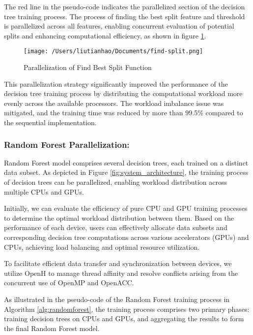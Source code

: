 \documentclass[13pt]{article}
\begin{document}
The red line in the pseudo-code indicates the parallelized section of the decision tree training process.
The process of finding the best split feature and threshold is parallelized across all features, enabling concurrent evaluation of potential splits and enhancing computational efficiency, as shown in figure \ref{fig:parallelization}.

\begin{figure}[h!]
    \centering
    \texttt{[image: /Users/liutianhao/Documents/find-split.png]}
    \caption{Parallelization of Find Best Split Function}
    \label{fig:parallelization}
\end{figure}

This parallelization strategy significantly improved the performance of the decision tree training process by distributing the computational workload more evenly across the available processors.
The workload imbalance issue was mitigated, and the training time was reduced by more than 99.5\% compared to the sequential implementation.

\subsubsection{Random Forest Parallelization:} 
    
Random Forest model comprises several decision trees, each trained on a distinct data subset. As depicted in Figure \ref{fig:system_architecture}, the training process of decision trees can be parallelized, enabling workload distribution across multiple CPUs and GPUs.

Initially, we can evaluate the efficiency of pure CPU and GPU training processes to determine the optimal workload distribution between them. Based on the performance of each device, users can effectively allocate data subsets and corresponding decision tree computations across various accelerators (GPUs) and CPUs, achieving load balancing and optimal resource utilization.

To facilitate efficient data transfer and synchronization between devices, we utilize OpenH to manage thread affinity and resolve conflicts arising from the concurrent use of OpenMP and OpenACC.

As illustrated in the pseudo-code of the Random Forest training process in Algorithm \ref{alg:randomforest}, the training process comprises two primary phases: training decision trees on CPUs and GPUs, and aggregating the results to form the final Random Forest model.
\end{document}
